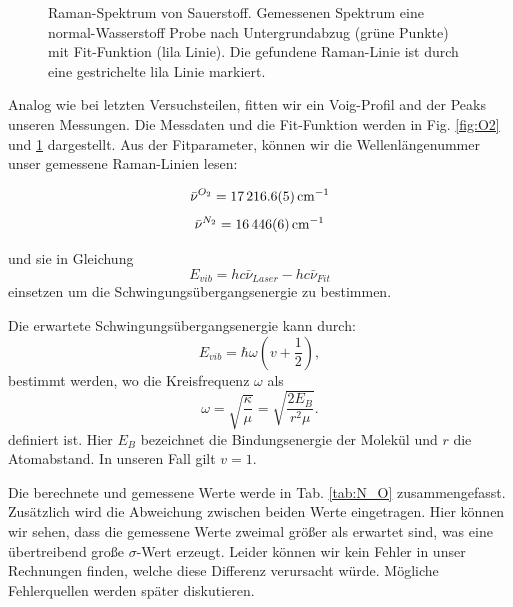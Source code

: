 \documentclass[11 pt]{article}
\begin{document}
\begin{figure}[htbp]
	\centering
   \caption{\small Raman-Spektrum von Sauerstoff. Gemessenen Spektrum eine normal-Wasserstoff Probe nach Untergrundabzug (grüne Punkte) mit Fit-Funktion (lila Linie). Die gefundene Raman-Linie ist durch eine gestrichelte lila Linie markiert.}
   \label{fig:N2}
\end{figure}

Analog wie bei letzten Versuchsteilen, fitten wir ein Voig-Profil and der Peaks unseren Messungen. Die Messdaten und die Fit-Funktion werden in Fig. \ref{fig:O2} und \ref{fig:N2} dargestellt. Aus der Fitparameter, können wir die Wellenlängenummer unser gemessene Raman-Linien lesen:

$$\bar{\nu}^{O_2} = \SI{17216.6\pm 0.5}{cm^{-1}}$$
$$\bar{\nu}^{N_2} = \SI{16446\pm 6}{cm^{-1}}$$

und sie in Gleichung
\begin{equation}
E_{vib} = hc\bar{\nu}_{Laser}- hc\bar{\nu}_{Fit}
\end{equation}
einsetzen um die Schwingungsübergangsenergie zu bestimmen. 

Die erwartete Schwingungsübergangsenergie kann durch:
\begin{equation}
E_{vib} = \hbar \omega \left( v + \dfrac{1}{2} \right),
\end{equation}
bestimmt werden, wo die Kreisfrequenz $\omega$ als 
\begin{equation}
\omega = \sqrt{\dfrac{\kappa}{\mu}} = \sqrt{\dfrac{2E_{B}}{r^2\mu}}.
\end{equation}
definiert ist. Hier $E_B$ bezeichnet die Bindungsenergie der Molekül und $r$ die Atomabstand. In unseren Fall gilt $v = 1$. 

Die berechnete und gemessene Werte werde in Tab. \ref{tab:N_O} zusammengefasst. Zusätzlich wird die Abweichung zwischen beiden Werte eingetragen. Hier können wir sehen, dass die gemessene Werte zweimal größer als erwartet sind, was eine übertreibend große $\sigma$-Wert erzeugt. Leider können wir kein Fehler in unser Rechnungen finden, welche diese Differenz verursacht würde. Mögliche Fehlerquellen werden später diskutieren.
\end{document}
